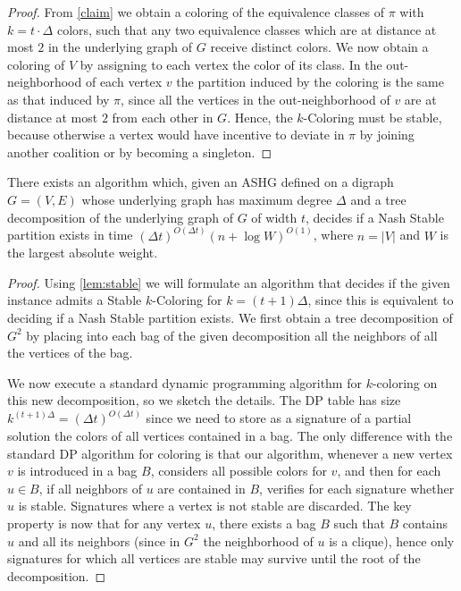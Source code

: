 \documentclass[letterpaper,USenglish,cleveref, autoref, thm-restate]{lipics-v2021}
\begin{document}
\begin{proof}
From \cref{claim} we obtain a coloring of the equivalence classes of $\pi$ with
$k=t\cdot \Delta$ colors, such that any two equivalence classes which are at
distance at most $2$ in the underlying graph of $G$ receive distinct colors. We
now obtain a coloring of $V$ by assigning to each vertex the color of its
class. In the out-neighborhood of each vertex $v$ the partition induced by the
coloring is the same as that induced by $\pi$, since all the vertices in the
out-neighborhood of $v$ are at distance at most $2$ from each other in $G$.
Hence, the $k$-Coloring must be stable, because otherwise a vertex would have
incentive to deviate in $\pi$ by joining another coalition or by becoming a
singleton.  \end{proof}


\begin{theorem}\label{thm:algtwd} There exists an algorithm which, given an
ASHG defined on a digraph $G=(V,E)$ whose underlying graph has maximum degree
$\Delta$ and a tree decomposition of the underlying graph of $G$ of width $t$,
decides if a Nash Stable partition exists in time $\left(\Delta
t\right)^{O(\Delta t)} (n+\log W)^{O(1)}$, where $n=|V|$ and $W$ is the largest
absolute weight.\end{theorem}



\begin{proof}

Using \cref{lem:stable} we will formulate an algorithm that decides if the
given instance admits a Stable $k$-Coloring for $k=(t+1)\Delta$, since this is
equivalent to deciding if a Nash Stable partition exists. We first obtain a
tree decomposition of $G^2$ by placing into each bag of the given decomposition
all the neighbors of all the vertices of the bag. 

We now execute a standard dynamic programming algorithm for $k$-coloring on
this new decomposition, so we sketch the details. The DP table has size
$k^{(t+1)\Delta} = (\Delta t)^{O(\Delta t)}$ since we need to store as a
signature of a partial solution the colors of all vertices contained in a bag.
The only difference with the standard DP algorithm for coloring is that our
algorithm, whenever a new vertex $v$ is introduced in a bag $B$, considers all
possible colors for $v$, and then for each $u\in B$, if all neighbors of $u$
are contained in $B$, verifies for each signature whether $u$ is stable.
Signatures where a vertex is not stable are discarded. The key property is now
that for any vertex $u$, there exists a bag $B$ such that $B$ contains $u$ and
all its neighbors (since in $G^2$ the neighborhood of $u$ is a clique), hence
only signatures for which all vertices are stable may survive until the root of
the decomposition.  \end{proof}
\end{document}
